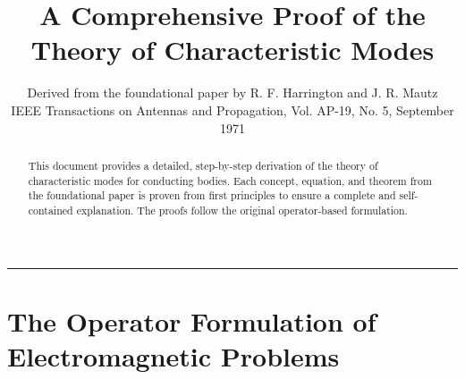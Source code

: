 \documentclass[11pt]{article}
\title{\huge \textbf{A Comprehensive Proof of the \\ Theory of Characteristic Modes}}
\author{Derived from the foundational paper by R. F. Harrington and J. R. Mautz \\[1em] \small{IEEE Transactions on Antennas and Propagation, Vol. AP-19, No. 5, September 1971}}
\date{}
\theoremstyle{definition}
\begin{document}
\maketitle

\begin{abstract}
This document provides a detailed, step-by-step derivation of the theory of characteristic modes for conducting bodies. Each concept, equation, and theorem from the foundational paper is proven from first principles to ensure a complete and self-contained explanation. The proofs follow the original operator-based formulation.
\end{abstract}

\hrule\vspace{1.5em}

\section{The Operator Formulation of Electromagnetic Problems}
\end{document}
